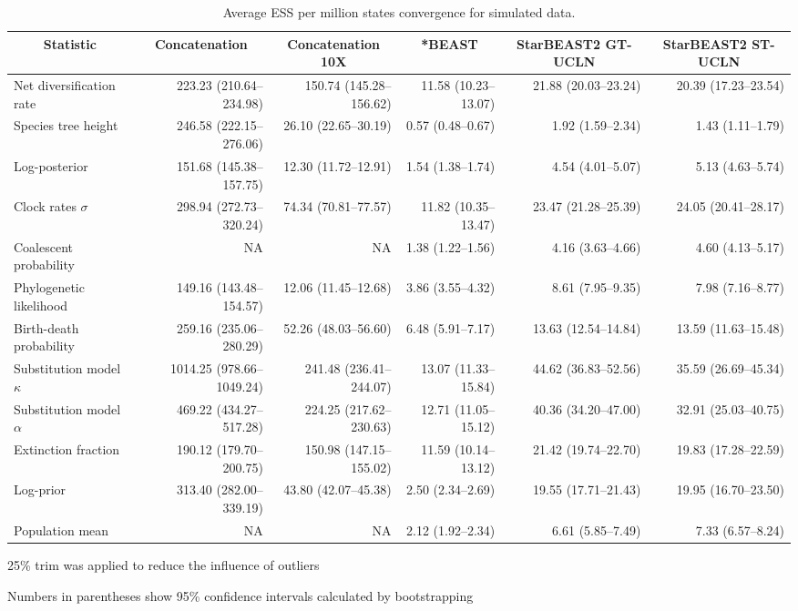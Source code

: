 \documentclass[12pt]{article}
\begin{document}
\begin{landscape}
\begin{table}[htb!]
\centering
\caption{Average ESS per million states convergence for simulated data.}
\label{tab:simulatedPerMstates}
\begin{threeparttable}
\begin{adjustbox}{center}
\renewcommand{\arraystretch}{1.2}
\scriptsize
\begin{tabular}{|l|r|r|r|r|r|}
\multicolumn{1}{c}{Statistic} & \multicolumn{1}{c}{Concatenation} & \multicolumn{1}{c}{Concatenation 10X} & \multicolumn{1}{c}{*BEAST} & \multicolumn{1}{c}{StarBEAST2 GT-UCLN} & \multicolumn{1}{c}{StarBEAST2 ST-UCLN}\tabularnewline
\hline
Net diversification rate & 223.23 (210.64--234.98) & 150.74 (145.28--156.62) & 11.58 (10.23--13.07) & 21.88 (20.03--23.24) & 20.39 (17.23--23.54)\tabularnewline
\hline
Species tree height & 246.58 (222.15--276.06) & 26.10 (22.65--30.19) & 0.57 (0.48--0.67) & 1.92 (1.59--2.34) & 1.43 (1.11--1.79)\tabularnewline
\hline
Log-posterior & 151.68 (145.38--157.75) & 12.30 (11.72--12.91) & 1.54 (1.38--1.74) & 4.54 (4.01--5.07) & 5.13 (4.63--5.74)\tabularnewline
\hline
Clock rates $\sigma$ & 298.94 (272.73--320.24) & 74.34 (70.81--77.57) & 11.82 (10.35--13.47) & 23.47 (21.28--25.39) & 24.05 (20.41--28.17)\tabularnewline
\hline
Coalescent probability & NA & NA & 1.38 (1.22--1.56) & 4.16 (3.63--4.66) & 4.60 (4.13--5.17)\tabularnewline
\hline
Phylogenetic likelihood & 149.16 (143.48--154.57) & 12.06 (11.45--12.68) & 3.86 (3.55--4.32) & 8.61 (7.95--9.35) & 7.98 (7.16--8.77)\tabularnewline
\hline
Birth-death probability & 259.16 (235.06--280.29) & 52.26 (48.03--56.60) & 6.48 (5.91--7.17) & 13.63 (12.54--14.84) & 13.59 (11.63--15.48)\tabularnewline
\hline
Substitution model $\kappa$ & 1014.25 (978.66--1049.24) & 241.48 (236.41--244.07) & 13.07 (11.33--15.84) & 44.62 (36.83--52.56) & 35.59 (26.69--45.34)\tabularnewline
\hline
Substitution model $\alpha$ & 469.22 (434.27--517.28) & 224.25 (217.62--230.63) & 12.71 (11.05--15.12) & 40.36 (34.20--47.00) & 32.91 (25.03--40.75)\tabularnewline
\hline
Extinction fraction & 190.12 (179.70--200.75) & 150.98 (147.15--155.02) & 11.59 (10.14--13.12) & 21.42 (19.74--22.70) & 19.83 (17.28--22.59)\tabularnewline
\hline
Log-prior & 313.40 (282.00--339.19) & 43.80 (42.07--45.38) & 2.50 (2.34--2.69) & 19.55 (17.71--21.43) & 19.95 (16.70--23.50)\tabularnewline
\hline
Population mean & NA & NA & 2.12 (1.92--2.34) & 6.61 (5.85--7.49) & 7.33 (6.57--8.24)\tabularnewline
\hline
\end{tabular}
\end{adjustbox}
\begin{tablenotes}
\scriptsize
\item 25\% trim was applied to reduce the influence of outliers
\item Numbers in parentheses show 95\% confidence intervals calculated by bootstrapping
\end{tablenotes}
\end{threeparttable}
\end{table}

\end{landscape}
\end{document}
